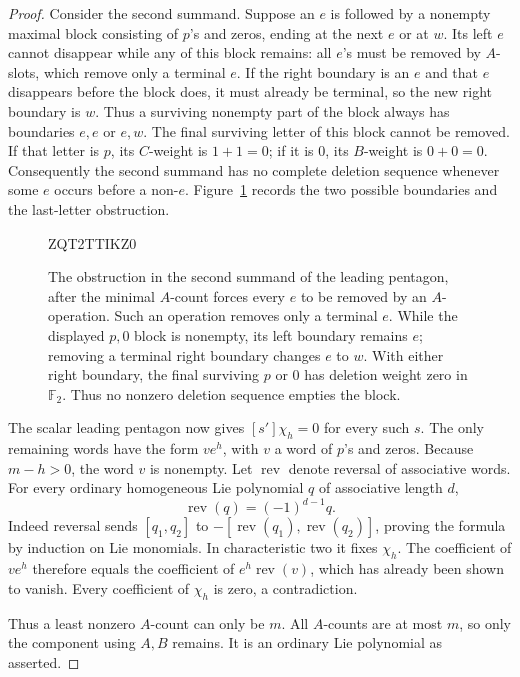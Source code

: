 \documentclass[11pt]{article}
\theoremstyle{definition}
\theoremstyle{remark}
\numberwithin{equation}{section}
\begin{document}
\begin{proof}
Consider the second summand.  Suppose an $e$ is followed by a nonempty
maximal block consisting of $p$'s and zeros, ending at the next $e$ or
at $w$.  Its left $e$ cannot disappear while any of this block remains:
all $e$'s must be removed by $A$-slots, which remove only a terminal
$e$.  If the right boundary is an $e$ and that $e$ disappears before
the block does, it must already be terminal, so the new right boundary
is $w$.  Thus a surviving nonempty part of the block always has
boundaries $e,e$ or $e,w$.  The final surviving letter of this block
cannot be removed.  If that letter is $p$, its $C$-weight is $1+1=0$;
if it is $0$, its $B$-weight
is $0+0=0$.  Consequently the second summand has no complete deletion
sequence whenever some $e$ occurs before a non-$e$.
Figure~\ref{fig:deletion-block} records the two possible boundaries and
the last-letter obstruction.

\begin{figure}[tbp]
  
  ZQT2TTIKZ0
  \caption{The obstruction in the second summand of the leading pentagon,
  after the minimal $A$-count forces every $e$ to be removed by an
  $A$-operation. Such an operation removes only a terminal $e$.
  While the displayed $p,0$ block is nonempty, its left boundary remains
  $e$; removing a terminal right boundary changes $e$ to $w$.
  With either right boundary, the final surviving $p$ or $0$ has deletion weight
  zero in $\mathbb F_2$. Thus no nonzero deletion sequence empties the block.}
  \label{fig:deletion-block}
\end{figure}


The scalar leading pentagon now gives $[s']\chi_h=0$ for every such
$s$.  The only remaining words have the form $v e^h$, with $v$ a word
of $p$'s and zeros.  Because $m-h>0$, the word $v$ is nonempty.  Let
$\operatorname{rev}$ denote reversal of associative words.  For every
ordinary homogeneous Lie polynomial $q$ of associative length $d$,
\[
 \operatorname{rev}(q)=(-1)^{d-1}q.
\]
Indeed reversal sends $[q_1,q_2]$ to
$-[\operatorname{rev}(q_1),\operatorname{rev}(q_2)]$, proving the
formula by induction on Lie monomials.  In characteristic two it fixes
$\chi_h$.  The coefficient of $v e^h$ therefore equals the coefficient
of $e^h\operatorname{rev}(v)$, which has already been shown to vanish.
Every coefficient of $\chi_h$ is zero, a contradiction.

Thus a least nonzero $A$-count can only be $m$.  All $A$-counts are at
most $m$, so only the component using $A,B$ remains.  It is an ordinary
Lie polynomial as asserted.
\end{proof}
\end{document}
